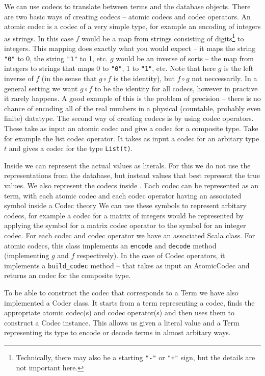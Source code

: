 We can use codecs to translate between \MMT terms and the database objects. There are two
basic ways of creating codecs -- atomic codecs and codec operators. An atomic codec is a
codec of a very simple type, for example an encoding of integers as strings. In this case
$f$ would be a map from strings consisting of digits\footnote{Technically, there may also
  be a starting \texttt{"-"} or \texttt{"+"} sign, but the details are not important
  here. } to integers. This mapping does exactly what you would expect -- it maps the
string \texttt{"0"} to 0, the string \texttt{"1"} to 1, etc. $g$ would be an inverse of
sorts -- the map from integers to strings that maps 0 to \texttt{"0"}, 1 to \texttt{"1"},
etc. Note that here $g$ is the left inverse of $f$ (in the sense that $g \circ f$ is the
identity), but $f \circ g$ not neccessarily. In a general setting we want $g \circ f$ to
be the identity for all codecs, however in practive it rarely happens. A good example of
this is the problem of precision -- there is no chance of encoding all of the real numbers
in a physical (countable, probably even finite) datatype.  The second way of creating
codecs is by using codec operators. These take as input an atomic codec and give a codec
for a composite type. Take for example the list codec operator. It takes as input a codec
for an arbitary type $t$ and gives a codec for the type \texttt{List(t)}.

Inside \MMT we can represent the actual values as literals. For this we do not use the
representations from the database, but instead values that best represent the true
values. We also represent the codecs inside \MMT. Each codec can be represented as an \MMT
term, with each atomic codec and each codec operator having an associated symbol inside a
Codec theory We can use these symbols to represent arbitary codecs, for example a codec
for a matrix of integers would be represented by applying the symbol for a matrix codec
operator to the symbol for an integer codec. For each codec and codec operator we have an
associated Scala class. For atomic codecs, this class implements an \texttt{encode} and
\texttt{decode} method (implementing $g$ and $f$ respectively). In the case of Codec
operators, it implements a \texttt{build\_codec} method --
that takes as input an AtomicCodec and returns an codec for the composite type.

To be able to construct the codec that corresponds to a Term we have also implemented a
Coder class. It starts from a term representing a codec, finds the
appropriate atomic codec(s) and codec operator(s) and then uses them to construct a Codec
instance. This allows us given a literal value and a Term representing its type to encode
or decode terms in almost arbitary ways.

